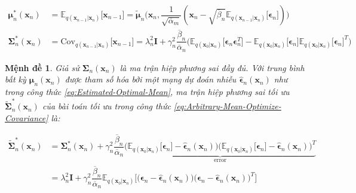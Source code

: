 \documentclass[14pt, a4paper]{article}
\numberwithin{equation}{section}
\numberwithin{figure}{section}
\newtheorem{md}{Mệnh đề}
\numberwithin{dl}{section}
\numberwithin{md}{section}
\numberwithin{bd}{section}
\numberwithin{dn}{section}
\numberwithin{hq}{section}
\begin{document}
    \begin{equation}
        \begin{aligned}
            \boldsymbol{\mu}_n^{\ast} (\boldsymbol{x}_n) &= \mathbb{E}_{q(\boldsymbol{x}_{n-1} \vert \boldsymbol{x}_n)} \lbrack \boldsymbol{x}_{n-1} \rbrack = \tilde{\boldsymbol{\mu}}_n \big( \boldsymbol{x}_n, \dfrac{1}{\sqrt{\overline{\alpha}_m}} (\boldsymbol{x}_n - \sqrt{\overline{\beta}_n}\mathbb{E}_{q(\boldsymbol{x}_{n-1} \vert \boldsymbol{x}_n)} \lbrack \boldsymbol{\epsilon}_n \rbrack) \big) \\
            \boldsymbol{\Sigma}_n^{\ast} (\boldsymbol{x}_n) &= \mathrm{Cov}_{q(\boldsymbol{x}_{n-1} \vert \boldsymbol{x}_n)} \lbrack \boldsymbol{x}_{n-1} \rbrack = \lambda_n^2 \boldsymbol{I} + \gamma_n^2 \dfrac{\overline{\beta}_n}{\overline{\alpha}_n} \big( \mathbb{E}_{q(\boldsymbol{x}_0 \vert \boldsymbol{x}_n)} \lbrack \boldsymbol{\epsilon}_n \boldsymbol{\epsilon}_n^T \rbrack - \mathbb{E}_{q(\boldsymbol{x}_0 \vert \boldsymbol{x}_n)} \lbrack \boldsymbol{\epsilon}_n \rbrack \mathbb{E}_{q(\boldsymbol{x}_0 \vert \boldsymbol{x}_n)} \lbrack \boldsymbol{\epsilon}_n \rbrack^T \big)
        \end{aligned}
    \end{equation}

    \begin{md} \label{md:Corrected-Optimal-Covariance-Solely-Full-Covariance}
        Giả sử $\boldsymbol{\Sigma}_n(\boldsymbol{x}_n)$ là ma trận hiệp phương sai đầy đủ.
        Với trung bình bất kỳ $\boldsymbol{\mu}_n (\boldsymbol{x}_n)$ được tham số hóa bởi một mạng dự đoán nhiễu $\hat{\boldsymbol{\epsilon}}_n (\boldsymbol{x}_n)$ như trong công thức \ref{eq:Estimated-Optimal-Mean}, ma trận hiệp phương sai tối ưu $\tilde{\boldsymbol{\Sigma}}_n^{\ast} (\boldsymbol{x}_n)$ của bài toán tối ưu trong công thức \ref{eq:Arbitrary-Mean-Optimize-Covariance} là:

        \begin{equation}
            \begin{aligned}
                \tilde{\boldsymbol{\Sigma}}_n^{\ast} (\boldsymbol{x}_n) &= \boldsymbol{\Sigma}_n^{\ast} (\boldsymbol{x}_n) + \gamma_n^2 \dfrac{\overline{\beta}_n}{\overline{\alpha}_n} \underbrace{\big( \mathbb{E}_{q(\boldsymbol{x}_0 \vert \boldsymbol{x}_n)} \lbrack \boldsymbol{\epsilon}_n \rbrack - \hat{\boldsymbol{\epsilon}}_n (\boldsymbol{x}_n) \big)\big( \mathbb{E}_{q(\boldsymbol{x}_0 \vert \boldsymbol{x}_n)} \lbrack \boldsymbol{\epsilon}_n \rbrack - \hat{\boldsymbol{\epsilon}}_n (\boldsymbol{x}_n) \big)^T}_{\mathrm{error}} \\
                &= \lambda_n^2 \boldsymbol{I} + \gamma_n^2 \dfrac{\overline{\beta}_n}{\overline{\alpha}_n} \mathbb{E}_{q(\boldsymbol{x}_0 \vert \boldsymbol{x}_n)} \big \lbrack \big( \boldsymbol{\epsilon}_n - \hat{\boldsymbol{\epsilon}}_n (\boldsymbol{x}_n) \big) \big( \boldsymbol{\epsilon}_n - \hat{\boldsymbol{\epsilon}}_n (\boldsymbol{x}_n) \big)^T \big \rbrack
            \end{aligned}
        \end{equation}
    \end{md}
\end{document}
